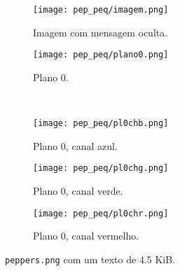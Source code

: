\begin{figure}[H]
    \centering
    \begin{subfigure}{0.4\textwidth}
        \centering
        \texttt{[image: pep\_peq/imagem.png]}
        \caption{Imagem com mensagem oculta.}
        \label{fig:pequeno:imagem}
    \end{subfigure}%
    \begin{subfigure}{0.4\textwidth}
        \centering
        \texttt{[image: pep\_peq/plano0.png]}
        \caption{Plano 0.}
        \label{fig:pequeno:plano}
    \end{subfigure}\\[8pt]
    \begin{subfigure}{0.28\textwidth}
        \centering
        \texttt{[image: pep\_peq/pl0chb.png]}
        \caption{Plano 0, canal azul.}
        \label{fig:pequeno:blue}
    \end{subfigure}%
    \begin{subfigure}{0.28\textwidth}
        \centering
        \texttt{[image: pep\_peq/pl0chg.png]}
        \caption{Plano 0, canal verde.}
        \label{fig:pequeno:green}
    \end{subfigure}%
    \begin{subfigure}{0.28\textwidth}
        \centering
        \texttt{[image: pep\_peq/pl0chr.png]}
        \caption{Plano 0, canal vermelho.}
        \label{fig:pequeno:red}
    \end{subfigure}%

    \caption{\texttt{peppers.png} com um texto de 4.5 KiB.}
    \label{fig:pequeno}
\end{figure}
